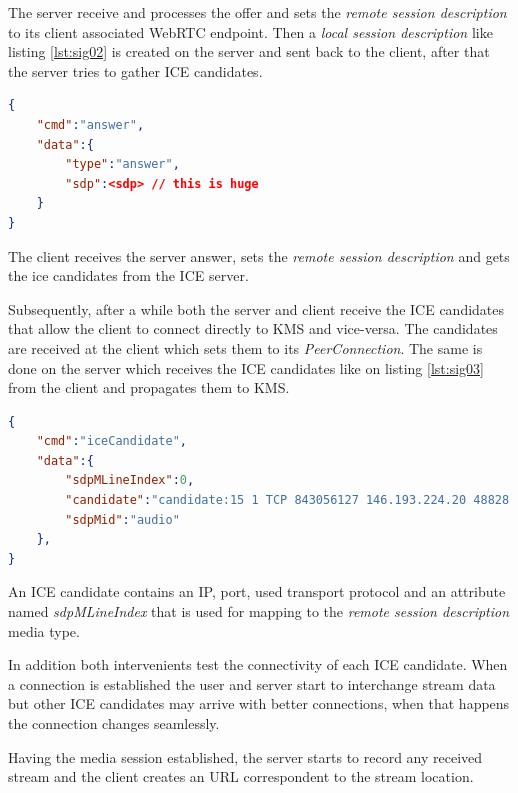 The server receive and processes the offer and sets the \emph{remote session description} to its client associated \ac{WebRTC} endpoint. Then a \emph{local session description} like listing \ref{lst:sig02} is created on the server and sent back to the client, after that the server tries to gather \ac{ICE} candidates.

\begin{minipage}{\linewidth}
\begin{lstlisting}[caption={Answer created by KMS},label={lst:sig02},language=json]
{
	"cmd":"answer",
	"data":{
		"type":"answer",
		"sdp":<sdp>	// this is huge
	}
}
\end{lstlisting}
\end{minipage}

The client receives the server answer, sets the \emph{remote session description} and gets the ice candidates from the \ac{ICE} server. 

Subsequently, after a while both the server and client receive the \ac{ICE} candidates that allow the client to connect directly to \ac{KMS} and vice-versa. The candidates are received at the client which sets them to its \emph{PeerConnection}. The same is done on the server which receives the \ac{ICE} candidates like on listing \ref{lst:sig03} from the client and propagates them to \ac{KMS}.

\begin{minipage}{\linewidth}
\begin{lstlisting}[caption={ICE candidates sent by KMS and client},label={lst:sig03},language=json]
{
	"cmd":"iceCandidate",
	"data":{
		"sdpMLineIndex":0,
		"candidate":"candidate:15 1 TCP 843056127 146.193.224.20 48828 typ srflx raddr 192.168.1.105 rport 48828 tcptype passive",
		"sdpMid":"audio"
	},
}
\end{lstlisting}
\end{minipage}

An \ac{ICE} candidate contains an \ac{IP}, port, used transport protocol and an attribute named \emph{sdpMLineIndex} that is used for mapping to the \emph{remote session description} media type.

In addition both intervenients test the connectivity of each \ac{ICE} candidate. When a connection is established the user and server start to interchange stream data but other \ac{ICE} candidates may arrive with better connections, when that happens the connection changes seamlessly. 

Having the media session established, the server starts to record any received stream and the client creates an \ac{URL} correspondent to the stream location.

